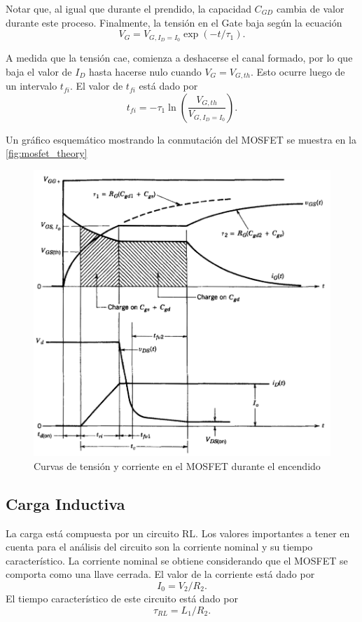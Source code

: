\documentclass[e4_tp1_main.tex]{subfiles}
\begin{document}
Notar que, al igual que durante el prendido, la capacidad $C_{GD}$ cambia de valor durante este proceso. Finalmente, la tensión en el Gate baja según la ecuación
\begin{equation}
V_{G} = V_{G,I_D=I_0}\exp(-t/\tau_1).
\end{equation}

A medida que la tensión cae, comienza a deshacerse el canal formado, por lo que baja el valor de $I_D$ hasta hacerse nulo cuando $V_G=V_{G,th}$. Esto ocurre luego de un intervalo $t_{fi}$. El valor de $t_{fi}$ está dado por
\begin{equation}
t_{fi}= -\tau_1\ln\left(\frac{V_{G,th}}{V_{G,I_D=I_0}}\right).
\end{equation}

Un gráfico esquemático mostrando la conmutación del MOSFET se muestra en la \autoref{fig:mosfet_theory}


\begin{figure}[H]
  \centering
  \includegraphics[width=\linewidth/2]{images/ej1/theory_mosfet.png}
  \caption{Curvas de tensión y corriente en el MOSFET durante el encendido}
  \label{fig:mosfet_theory}
\end{figure}


\subsection{Carga Inductiva}
La carga está compuesta por un circuito RL. Los valores importantes a tener en cuenta para el análisis del circuito son la corriente nominal y su tiempo característico. La corriente nominal se obtiene considerando que el MOSFET se comporta como una llave cerrada. El valor de la corriente está dado por
\begin{equation}
I_0 = V_2/R_2.
\end{equation}
El tiempo característico de este circuito está dado por
\begin{equation}
\tau_{RL} = L_1/R_2.
\end{equation}
\end{document}
